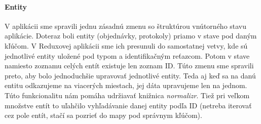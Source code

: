 \begin{comment}
  }

//zmena poslana na server - middleware
const entityChangedEpic = (action$: any, { firebase }: Deps) =>
  action$
    .filter((action: Action) => action.type === "CHANGE_ENTITY_FIELD")
    .mergeMap(action => {
      var { entity, id, field, value } = action.payload;

      var newField = {};
      newField[field] = value;
      var source = `${pl(entity)}/${id}.json`
      const promise = fetch(serverUrl + source, {
        method: "PATCH",
        headers: new Headers({
          "X-Requested-With": "eusahub-redux-app",
          "X-USER-TOKEN": token,
          "Content-Type": "application/json"
        }),
        body: JSON.stringify(newField)
      });

      return Observable.from(promise.then(response => response.json()))
        .mergeMap(response =>
          Observable.from(entityPatched(entity, response)))
        .catch(error => Observable.of(appError(error)));
    });
\end{lstlisting}

\end{comment}

\paragraph{Entity}%
V aplikácii sme spravili jednu zásadnú zmenu so štruktúrou vnútorného stavu aplikácie. Doteraz boli entity (objednávky, protokoly) priamo v stave pod daným kľúčom. 
V Reduxovej aplikácii sme ich presunuli do samostatnej vetvy, kde sú jednotlivé entity uložené pod typom a identifikačným reťazcom. Potom v stave namiesto zoznamu celých entít existuje len zoznam ID. 
Túto zmenu sme spravili preto, aby bolo jednoduchšie upravovať jednotlivé entity. Teda aj keď sa na danú entitu odkazujeme na viacerých miestach, jej dáta upravujeme len na jednom. Túto funkcionalitu nám pomáha udržiavať knižnica \emph{normalizr}.
Tiež pri veľkom množstve entít to uľahčilo vyhľadávanie danej entity podľa ID (netreba iterovať cez pole entít, stačí sa pozrieť do mapy pod správnym kľúčom).